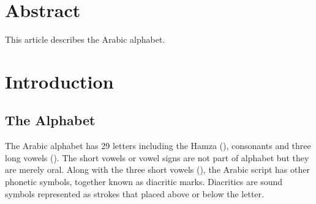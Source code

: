 \documentclass{jlcl}
\title{\articletitle}
\author{AUTHOR NAME\\
AUTHOR INSTITUTION\\
\texttt{AUTHOR EMAIL} \and
AUTHOR 2 NAME\\
AUTHOR 2 INSTITUTION\\
 \texttt{AUTHOR 2 EMAIL}}
\begin{document}
\setcounter{page}{1}
\thispagestyle{firstpage}

\authordata



\section*{Abstract}
This article describes the Arabic alphabet.



\section{Introduction}

\subsection{The Alphabet}

The Arabic alphabet has 29 letters including the Hamza (), consonants and three long vowels ().
The short vowels or vowel signs are not part of alphabet but they are merely oral.
Along with the three short vowels (), the Arabic script has other phonetic symbols, together known as diacritic marks.
Diacritics are sound symbols represented as strokes that placed above or below the letter.



\nocite{*}

{\small }
\end{document}
